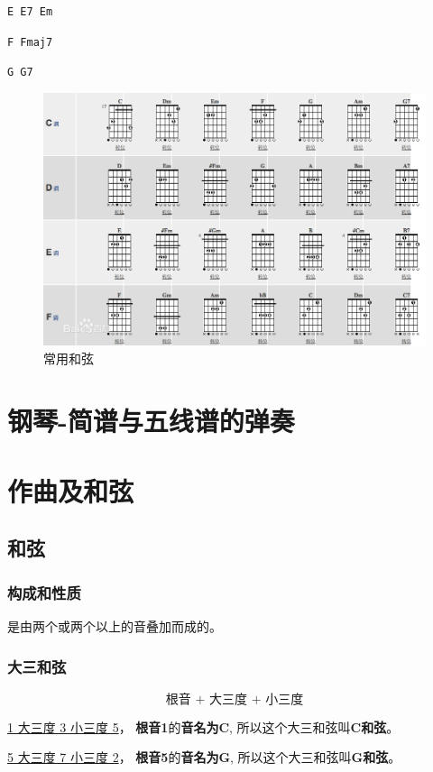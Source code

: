 \documentclass[UTF8,a4paper,12pt]{ctexbook}
\begin{document}
		 \verb|E E7 Em| 
		 
		 \verb|F Fmaj7| 
		 
		 \verb|G G7 | 
	
			\begin{figure}[H]
				\centering
				\includegraphics[scale=0.5]{hexuan}
				\caption{常用和弦}
			\end{figure}
							
\chapter{钢琴-简谱与五线谱的弹奏}

\chapter{作曲及和弦}
	\section{和弦}
		\subsection{构成和性质}
			是由两个或两个以上的音叠加而成的。
			
		\subsection{大三和弦}
			$$ \textbf{根音 + 大三度 + 小三度} $$
			
			\underline{1 大三度 3  小三度 5}， \textbf{根音1}的\textbf{音名为C}, 所以这个大三和弦叫\textbf{C和弦}。

			\underline{5 大三度 7  小三度 2}， \textbf{根音5}的\textbf{音名为G}, 所以这个大三和弦叫\textbf{G和弦}。
			
\end{document}
